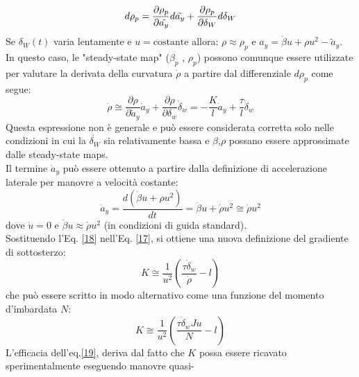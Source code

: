 \begin{equation}
   d\rho_p = \frac{\partial \rho_p}{\partial \Tilde{a_y}} d\Tilde{a_y} + \frac{\partial \rho_p}{\partial \delta_W} d\delta_W 
\end{equation}
Se $\delta_W(t)$ varia lentamente e $u = \text{costante}$ allora: \quad $\rho \approx \rho_p$ \quad e \quad  $a_y = 
\dot{\beta}u + \rho u^2 - \tilde{a}_y$.\\ 
In questo caso, le "steady-state map" ($\beta_p$ , $\rho_p$) possono comunque essere utilizzate per valutare la derivata
della curvatura $\dot{\rho}$ a partire dal differenziale $d\rho_p$ come segue:
\begin{equation} \label{17}
\dot{\rho} \cong \frac{\partial \rho}{\partial \tilde{a}_y} \dot{a}_y + \frac{\partial \rho}{\partial \delta_w} \dot{\delta}_w = - \frac{K}{l}\dot{a}_y + \frac{\tau}{l} \dot{\delta}_w
\end{equation}
Questa espressione non è generale e può essere considerata corretta solo nelle condizioni in cui la $\dot{\delta_W}$ sia relativamente bassa e $\beta$,$\rho$ possano essere approssimate dalle steady-state maps.\\
Il termine $\dot{a}_y$ può essere ottenuto a partire dalla definizione di accelerazione laterale per manovre a velocità costante:
\begin{equation} \label{18}
    \dot{a}_y = \frac{d(\dot{\beta}u + \rho u^2)}{dt} = \ddot{\beta}u + \dot{\rho}u^2 \cong \dot{\rho}u^2
\end{equation}
dove $\dot{u} = 0$   e  $\ddot{\beta}u \approx \dot{\rho}u^2$ (in condizioni di guida standard).\\ 
Sostituendo l'Eq. \ref{18} nell'Eq. \ref{17}, si ottiene una nuova definizione del gradiente di sottosterzo:
\begin{equation} \label{19}
    K \cong \frac{1}{u^2} \left( \frac{\tau \dot{\delta}_w }{\dot{\rho}} - l \right)    
\end{equation}
che può essere scritto in modo alternativo come una funzione del momento d'imbardata $N$:
\begin{equation} \label{20}
    K \cong \frac{1}{u^2} \left( \frac{\tau \dot{\delta}_wJu}{N} - l \right)
\end{equation}
L'efficacia dell'eq.\ref{19}, deriva dal fatto che $K$ possa essere ricavato sperimentalmente eseguendo manovre quasi-
